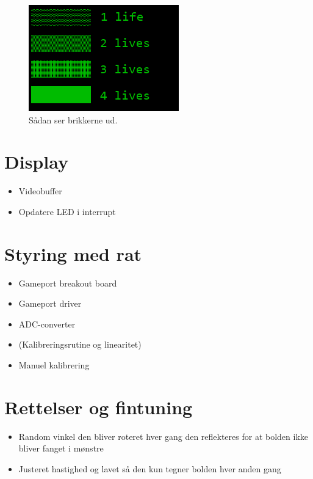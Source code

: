 \begin{figure}[h!]
\centering
\includegraphics[scale=0.5]{figs/brikker.png}
\caption{Sådan ser brikkerne ud.}
\label{fig:brik}
\end{figure}
		

\section{Display}
\begin{itemize}
\item Videobuffer
\item Opdatere LED i interrupt
\end{itemize}

\section{Styring med rat}
\begin{itemize}
\item Gameport breakout board
\item Gameport driver
\item ADC-converter
\item (Kalibreringsrutine og linearitet)
\item Manuel kalibrering
\end{itemize}


\section{Rettelser og fintuning}
\begin{itemize}
\item Random vinkel den bliver roteret hver gang den reflekteres for at bolden ikke bliver fanget i mønstre
\item Justeret hastighed og lavet så den kun tegner bolden hver anden gang
\end{itemize}
